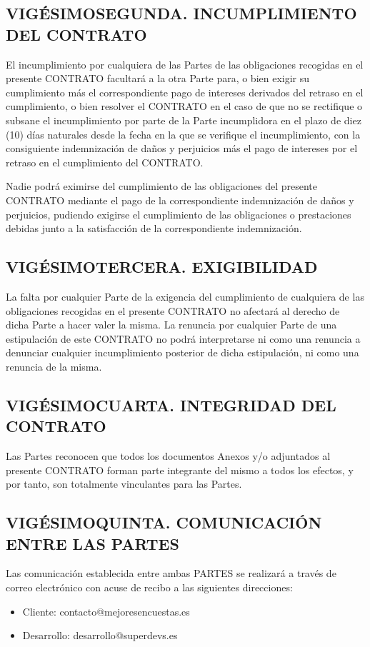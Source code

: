 \documentclass[a4paper,11pt]{report}
\begin{document}
	\subsection*{VIGÉSIMOSEGUNDA. INCUMPLIMIENTO DEL CONTRATO}

	El incumplimiento por cualquiera de las Partes de las obligaciones
	recogidas en el presente CONTRATO facultará a la otra Parte para, o bien
	exigir su cumplimiento más el correspondiente pago de intereses
	derivados del retraso en el cumplimiento, o bien resolver el CONTRATO en
	el caso de que no se rectifique o subsane el incumplimiento por parte de
	la Parte incumplidora en el plazo de diez (10) días naturales desde la
	fecha en la que se verifique el incumplimiento, con la consiguiente
	indemnización de daños y perjuicios más el pago de intereses por el
	retraso en el cumplimiento del CONTRATO.

	Nadie podrá eximirse del cumplimiento de las obligaciones del presente
	CONTRATO mediante el pago de la correspondiente indemnización de daños y
	perjuicios, pudiendo exigirse el cumplimiento de las obligaciones o
	prestaciones debidas junto a la satisfacción de la correspondiente
	indemnización.

	\subsection*{VIGÉSIMOTERCERA. EXIGIBILIDAD}

	La falta por cualquier Parte de la exigencia del cumplimiento de
	cualquiera de las obligaciones recogidas en el presente CONTRATO no
	afectará al derecho de dicha Parte a hacer valer la misma. La renuncia
	por cualquier Parte de una estipulación de este CONTRATO no podrá
	interpretarse ni como una renuncia a denunciar cualquier incumplimiento
	posterior de dicha estipulación, ni como una renuncia de la misma.

	\subsection*{VIGÉSIMOCUARTA. INTEGRIDAD DEL CONTRATO}

	Las Partes reconocen que todos los documentos Anexos y/o adjuntados al
	presente CONTRATO forman parte integrante del mismo a todos los efectos,
	y por tanto, son totalmente vinculantes para las Partes.
	
	\subsection*{VIGÉSIMOQUINTA. COMUNICACIÓN ENTRE LAS PARTES}
    Las comunicación establecida entre ambas PARTES se realizará a través de correo electrónico con acuse de recibo a las siguientes direcciones:
    \begin{itemize}
    \item Cliente: contacto@mejoresencuestas.es
    \item Desarrollo: desarrollo@superdevs.es
    \end{itemize}
\end{document}
